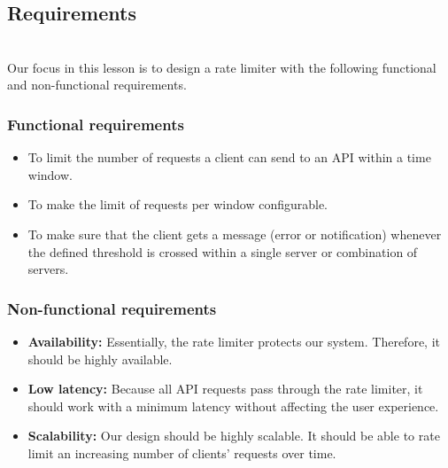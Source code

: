 

\subsection{Requirements}\label{5iIMoFidxXrrvxkxGeMYq}
\\
Our focus in this lesson is to design a rate limiter with the following functional and non-functional requirements.

\subsubsection{Functional requirements}\label{NTyGAt68lfKAjDqwXYkZA}

\begin{itemize}
\item
\protect{}\label{lHw9OwEqGwsrAh4ra4_kp}
To limit the number of requests a client can send to an API within a time window.
\item
\protect{}\label{CJKVWv_eCd8tGacJZIJ-3}
To make the limit of requests per window configurable.
\item
\protect{}\label{knzH90E0RnYqegHqO_h3Y}
To make sure that the client gets a message (error or notification) whenever the defined threshold is crossed within a single server or combination of servers.
\end{itemize}

\subsubsection{Non-functional requirements}\label{wxFOM0BwLtwbwGFQKQpqv}

\begin{itemize}
\item
\protect{}\label{JdEMZBzSxBHee43v-XECd}
\textbf{Availability:} Essentially, the rate limiter protects our system. Therefore, it should be highly available.
\item
\protect{}\label{nNaVz3wJLrOpMte3jvoyu}
\textbf{Low latency:} Because all API requests pass through the rate limiter, it should work with a minimum latency without affecting the user experience.
\item
\protect{}\label{Vmj8DSaWJsOIb-fWGVlxg}
\textbf{Scalability:} Our design should be highly scalable. It should be able to rate limit an increasing number of clients' requests over time.
\end{itemize}

